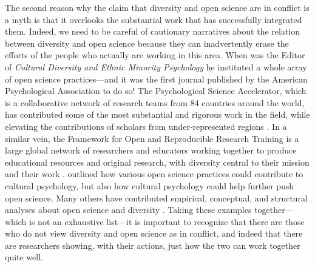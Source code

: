 \documentclass[authordate, empirical]{jote-new-article}
\begin{document}
The second reason why the claim that diversity and open science are in conflict is a myth is that it overlooks the substantial work that has successfully integrated them. Indeed, we need to be careful of cautionary narratives about the relation between diversity and open science because they can inadvertently erase the efforts of the people who actually are working in this area. When \textcite{Lee2017} was the Editor of \emph{Cultural Diversity and Ethnic Minority Psychology} he instituted a whole array of open science practices—and it was the first journal published by the American Psychological Association to do so! The Psychological Science Accelerator, which is a collaborative network of research teams from 84 countries around the world, has contributed some of the most substantial and rigorous work in the field, while elevating the contributions of scholars from under-represented regions \parencites{Moshontz2018}. In a similar vein, the Framework for Open and Reproducible Research Training \parencites[FORRT;][]{Azevedo2019} is a large global network of researchers and educators working together to produce educational resources and original research, with diversity central to their mission and their work \parencites{Elsherif2022}. \textcite{Syed2022} outlined how various open science practices could contribute to cultural psychology, but also how cultural psychology could help further push open science. Many others have contributed empirical, conceptual, and structural analyses about open science and diversity \parencites{Humphreys2021}{Ledgerwood2022}{Lui2022}. Taking these examples together—which is not an exhaustive list—it is important to recognize that there are those who do not view diversity and open science as in conflict, and indeed that there are researchers showing, with their actions, just how the two can work together quite well.
\end{document}
